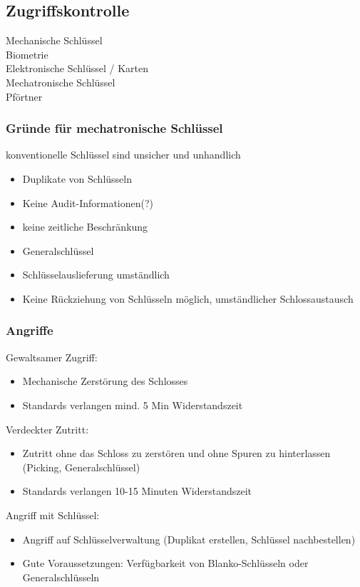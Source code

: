 \documentclass{article} %
\begin{document}
\subsection{Zugriffskontrolle}
Mechanische Schlüssel\\
Biometrie\\
Elektronische Schlüssel / Karten\\
Mechatronische Schlüssel\\
Pförtner
\subsubsection{Gründe für mechatronische Schlüssel}
konventionelle Schlüssel sind unsicher und unhandlich
\begin{itemize}
	\item Duplikate von Schlüsseln
    \item Keine Audit-Informationen(?)
    \item keine zeitliche Beschränkung
    \item Generalschlüssel
    \item Schlüsselauslieferung umständlich
    \item Keine Rückziehung von Schlüsseln möglich, umständlicher Schlossaustausch
\end{itemize}
\subsubsection{Angriffe}
Gewaltsamer Zugriff:
\begin{itemize}
	\item Mechanische Zerstörung des Schlosses
    \item Standards verlangen mind. 5 Min Widerstandszeit
\end{itemize}
Verdeckter Zutritt:
\begin{itemize}
	\item Zutritt ohne das Schloss zu zerstören und ohne Spuren zu hinterlassen (Picking, Generalschlüssel)
    \item Standards verlangen 10-15 Minuten Widerstandszeit
\end{itemize}
Angriff mit Schlüssel:
\begin{itemize}
	\item Angriff auf Schlüsselverwaltung (Duplikat erstellen, Schlüssel nachbestellen)
    \item Gute Voraussetzungen: Verfügbarkeit von Blanko-Schlüsseln oder Generalschlüsseln
\end{itemize}
\end{document}
